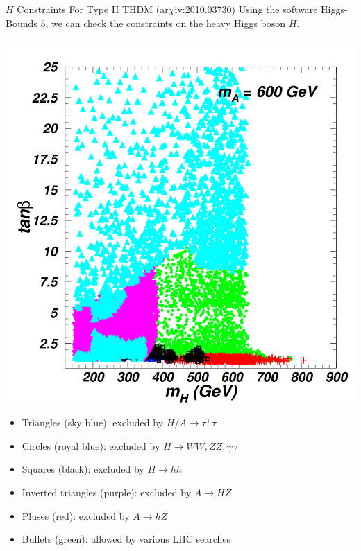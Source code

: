 \documentclass{../bredelebeamer}
\newcommand{\arxiv}{ar$\chi$iv:}
\begin{document}
\begin{frame}{$H$ Constraints For Type II THDM (\arxiv 2010.03730)}
    Using the software Higgs-Bounds 5, we can check the constraints on the heavy Higgs boson $H$. 

    \begin{minipage}{0.48\textwidth}
        \includegraphics[width=\textwidth]{HH_Constraints.png}
    \end{minipage}\hfill
\begin{minipage}{0.48\textwidth}
    \begin{itemize}
        \item Triangles (sky blue): excluded by $H/A \rightarrow \tau^{+} \tau^{-}$\vfill
        \item Circles (royal blue): excluded by $H \rightarrow W W, Z Z, \gamma \gamma$\vfill
        \item Squares (black): excluded by $H \rightarrow h h$\vfill
        \item Inverted triangles (purple): excluded by $A \rightarrow H Z$\vfill
        \item Pluses (red): excluded by $A \rightarrow h Z$\vfill
        \item Bullets (green): allowed by various LHC searches
        \end{itemize}
    \end{minipage}
\end{frame}
\end{document}
